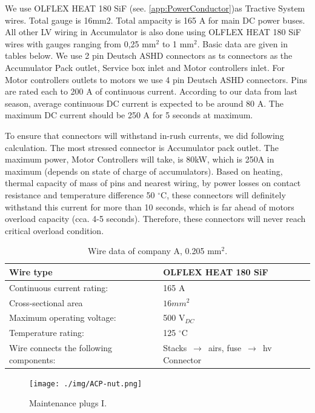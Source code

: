 We use OLFLEX HEAT 180 SiF (see. \ref{app:PowerConductor})as Tractive System wires. Total gauge is 16mm2. Total ampacity is 165 A for main DC power buses. All other LV wiring in Accumulator is also done using OLFLEX HEAT 180 SiF wires with gauges ranging from 0,25 mm$^2$ to 1 mm$^2$. Basic data are given in tables below. We use 2 pin Deutsch ASHD connectors as \gls{ts} connectors as the Accumulator Pack outlet, Service box inlet and Motor controllers inlet. For Motor controllers outlets to motors we use 4 pin Deutsch ASHD connectors. Pins are rated each to 200 A of continuous current. According to our data from last season, average continuous DC current is expected to be around 80 A. The maximum DC current should be 250 A for 5 seconds at maximum.

To ensure that connectors will withstand in-rush currents, we did following calculation. The most stressed connector is Accumulator pack outlet. The maximum power, Motor Controllers will take, is 80kW, which is 250A in maximum (depends on state of charge of accumulators). Based on heating, thermal capacity of mass of pins and nearest wiring, by power losses on contact resistance and temperature difference 50 $^\circ$C, these connectors will definitely withstand this current for more than 10 seconds, which is far ahead of motors overload capacity (cca. 4-5 seconds). Therefore, these connectors will never reach critical overload condition.


\begin{table}[htbp]
	\centering
	\caption{Wire data of company A, 0.205 mm$^2$.}
	\begin{tabu}{|X|X|}\hline
		Wire type & OLFLEX HEAT 180 SiF \\\hline
		Continuous current rating: & 165 A \\\hline
		Cross-sectional area & $16mm^2$ \\\hline
		Maximum operating voltage: &  500 V$_{DC}$\\\hline
		Temperature rating: &  125 $^\circ$C\\\hline
		Wire connects the following components: & Stacks $\,\to\,$ \glspl{air}, fuse $\,\to\,$ \gls{hv} Connector \\\hline
	\end{tabu}%
	\label{tab:acc-wire}%
\end{table}%

\begin{figure}[H]
	\centering
	\texttt{[image: ./img/ACP-nut.png]}
	\caption{Maintenance plugs I.}
	\label{fig:acp-maintance-plug}
\end{figure}

